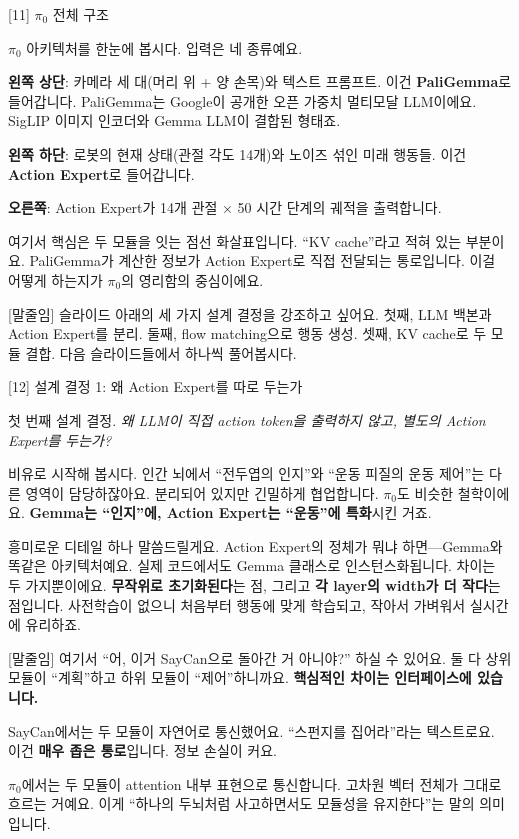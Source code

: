\documentclass[aspectratio=169,10pt]{beamer}
\newenvironment{script}{%
  \footnotesize
  \setlength{\parskip}{0.5em}
  \setlength{\parindent}{0pt}
}{}
\begin{document}
\begin{frame}{[11] $\pi_0$ 전체 구조}
\begin{script}
$\pi_0$ 아키텍처를 한눈에 봅시다. 입력은 네 종류예요.

\textbf{왼쪽 상단}: 카메라 세 대(머리 위 + 양 손목)와 텍스트 프롬프트. 이건 \textbf{PaliGemma}로 들어갑니다. PaliGemma는 Google이 공개한 오픈 가중치 멀티모달 LLM이에요. SigLIP 이미지 인코더와 Gemma LLM이 결합된 형태죠.

\textbf{왼쪽 하단}: 로봇의 현재 상태(관절 각도 14개)와 노이즈 섞인 미래 행동들. 이건 \textbf{Action Expert}로 들어갑니다.

\textbf{오른쪽}: Action Expert가 14개 관절 × 50 시간 단계의 궤적을 출력합니다.

여기서 \alert{핵심은 두 모듈을 잇는 점선 화살표}입니다. ``KV cache''라고 적혀 있는 부분이요. PaliGemma가 계산한 정보가 Action Expert로 직접 전달되는 통로입니다. 이걸 어떻게 하는지가 $\pi_0$의 영리함의 중심이에요.

[말줄임] 슬라이드 아래의 세 가지 설계 결정을 강조하고 싶어요. 첫째, LLM 백본과 Action Expert를 분리. 둘째, flow matching으로 행동 생성. 셋째, KV cache로 두 모듈 결합. 다음 슬라이드들에서 하나씩 풀어봅시다.
\end{script}
\end{frame}

\begin{frame}{[12] 설계 결정 1: 왜 Action Expert를 따로 두는가}
\begin{script}
첫 번째 설계 결정. \textit{왜 LLM이 직접 action token을 출력하지 않고, 별도의 Action Expert를 두는가?}

비유로 시작해 봅시다. 인간 뇌에서 ``전두엽의 인지''와 ``운동 피질의 운동 제어''는 다른 영역이 담당하잖아요. 분리되어 있지만 긴밀하게 협업합니다. $\pi_0$도 비슷한 철학이에요. \textbf{Gemma는 ``인지''에, Action Expert는 ``운동''에 특화}시킨 거죠.

흥미로운 디테일 하나 말씀드릴게요. Action Expert의 정체가 뭐냐 하면---\alert{Gemma와 똑같은 아키텍처}예요. 실제 코드에서도 Gemma 클래스로 인스턴스화됩니다. 차이는 두 가지뿐이에요. \textbf{무작위로 초기화된다}는 점, 그리고 \textbf{각 layer의 width가 더 작다}는 점입니다. 사전학습이 없으니 처음부터 행동에 맞게 학습되고, 작아서 가벼워서 실시간에 유리하죠.

[말줄임] 여기서 ``어, 이거 SayCan으로 돌아간 거 아니야?'' 하실 수 있어요. 둘 다 상위 모듈이 ``계획''하고 하위 모듈이 ``제어''하니까요. \textbf{핵심적인 차이는 인터페이스에 있습니다.}

SayCan에서는 두 모듈이 \alert{자연어로 통신}했어요. ``스펀지를 집어라''라는 텍스트로요. 이건 \textbf{매우 좁은 통로}입니다. 정보 손실이 커요.

$\pi_0$에서는 두 모듈이 \alert{attention 내부 표현으로 통신}합니다. 고차원 벡터 전체가 그대로 흐르는 거예요. 이게 ``하나의 두뇌처럼 사고하면서도 모듈성을 유지한다''는 말의 의미입니다.
\end{script}
\end{frame}
\end{document}
